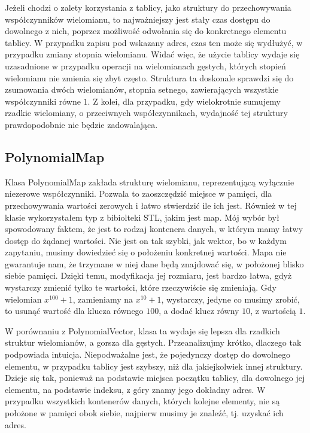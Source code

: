\documentclass[twoside,a4paper]{book}
\begin{document}
Jeżeli chodzi o zalety korzystania z tablicy, jako struktury do przechowywania współczynników wielomianu, to najważniejszy jest stały czas dostępu do dowolnego z nich, poprzez możliwość odwołania się do konkretnego elementu tablicy. W przypadku zapisu pod wskazany adres, czas ten może się wydłużyć, w przypadku zmiany stopnia wielomianu. Widać więc, że użycie tablicy wydaje się uzasadnione w przypadku operacji na wielomianach gęstych, których stopień wielomianu nie zmienia się zbyt często. Struktura ta doskonale sprawdzi się do zsumowania dwóch wielomianów, stopnia setnego, zawierających wszystkie współczynniki równe $1$. Z kolei, dla przypadku, gdy wielokrotnie sumujemy rzadkie wielomiany, o przeciwnych współczynnikach, wydajność tej struktury prawdopodobnie nie będzie zadowalająca.

\subsection{PolynomialMap}

Klasa PolynomialMap zakłada strukturę wielomianu, reprezentującą wyłącznie niezerowe współczynniki.
Pozwala to zaoszczędzić miejsce w pamięci, dla przechowywania wartości zerowych i łatwo stwierdzić ile ich jest. Również w tej klasie wykorzystałem typ z bibiolteki STL, jakim jest map. Mój wybór był spowodowany faktem, że jest to rodzaj kontenera danych, w którym mamy łatwy dostęp do żądanej wartości. Nie jest on tak szybki, jak wektor, bo w każdym zapytaniu, musimy dowiedzieć się o położeniu konkretnej wartości. Mapa nie gwarantuje nam, że trzymane w niej dane będą znajdować się, w położonej blisko siebie pamięci. Dzięki temu, modyfikacja jej rozmiaru, jest bardzo łatwa, gdyż wystarczy zmienić tylko te wartości, które rzeczywiście się zmieniają. Gdy wielomian $x^{100} + 1$, zamieniamy na $x^{10} + 1$, wystarczy, jedyne co musimy zrobić, to usunąć wartość dla klucza równego $100$, a dodać klucz równy $10$, z wartością $1$.

W porównaniu z PolynomialVector, klasa ta wydaje się lepsza dla rzadkich struktur wielomianów, a gorsza dla gęstych. Przeanalizujmy krótko, dlaczego tak podpowiada intuicja. Niepodważalne jest, że pojedynczy dostęp do dowolnego elementu, w przypadku tablicy jest szybszy, niż dla jakiejkolwiek innej struktury. Dzieje się tak, ponieważ na podstawie miejsca początku tablicy, dla dowolnego jej elementu, na podstawie indeksu, z góry znamy jego dokładny adres. W przypadku wszystkich kontenerów danych, których kolejne elementy, nie są położone w pamięci obok siebie, najpierw musimy je znaleźć, tj. uzyskać ich adres.
\end{document}
